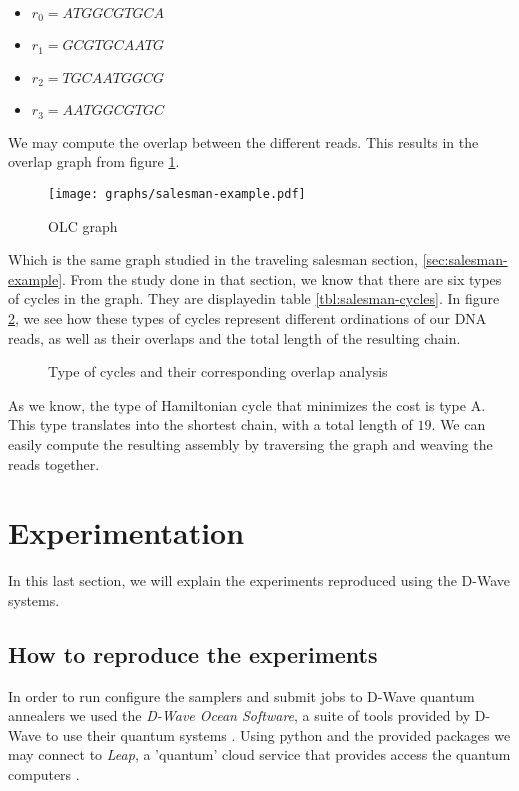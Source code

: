 \begin{itemize}
	\item $r_0 = ATGGCGTGCA$
	\item $r_1 = GCGTGCAATG$
	\item $r_2 = TGCAATGGCG$
	\item $r_3 = AATGGCGTGC$
\end{itemize}

We may compute the overlap between the different reads. This results in the overlap graph from figure \ref{fig:overlap-graph}.

\begin{figure}[h]
	\texttt{[image: graphs/salesman-example.pdf]}
	\centering
	\caption{OLC graph}
	\label{fig:overlap-graph}
\end{figure}

Which is the same graph studied in the traveling salesman section, \ref{sec:salesman-example}. From the study done in that section, we know that there are six types of cycles in the graph. They are displayedin table \ref{tbl:salesman-cycles}. In figure \ref{fig:overlap-cycles}, we see how these types of cycles represent different ordinations of our DNA reads, as well as their overlaps and the total length of the resulting chain.

\begin{figure}[h]
	\centering
	\caption{Type of cycles and their corresponding overlap analysis \cite{Sarkar2020}}
	\label{fig:overlap-cycles}
\end{figure}

As we know, the type of Hamiltonian cycle that minimizes the cost is type A. This type translates into the shortest chain, with a total length of $19$. We can easily compute the resulting assembly by traversing the graph and weaving the reads together.


\section{Experimentation}


In this last section, we will explain the experiments reproduced using the D-Wave systems.


\subsection{How to reproduce the experiments}


In order to run configure the samplers and submit jobs to D-Wave quantum annealers we used the \emph{D-Wave Ocean Software}, a suite of tools provided by D-Wave to use their quantum systems \cite{DWave-OceanDoc}. Using python and the provided packages we may connect to \emph{Leap}, a 'quantum' cloud service that provides access the quantum computers \cite{DWave-Leap}.

